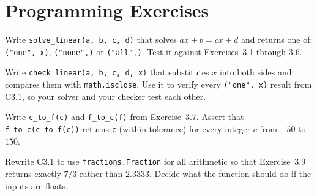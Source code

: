 \section{Programming Exercises}

\begin{codeexercises}
\item Write \lstinline!solve_linear(a, b, c, d)! that solves $ax + b = cx + d$ and returns one of: \lstinline!("one", x)!, \lstinline!("none",)! or \lstinline!("all",)!. Test it against Exercises~3.1 through 3.6.
\item Write \lstinline!check_linear(a, b, c, d, x)! that substitutes $x$ into both sides and compares them with \lstinline!math.isclose!. Use it to verify every \lstinline!("one", x)! result from C3.1, so your solver and your checker test each other.
\item Write \lstinline!c_to_f(c)! and \lstinline!f_to_c(f)! from Exercise~3.7. Assert that \lstinline!f_to_c(c_to_f(c))! returns \lstinline!c! (within tolerance) for every integer $c$ from $-50$ to $150$.
\item Rewrite C3.1 to use \lstinline!fractions.Fraction! for all arithmetic so that Exercise~3.9 returns exactly $7/3$ rather than $2.3333$. Decide what the function should do if the inputs are floats.
\end{codeexercises}

